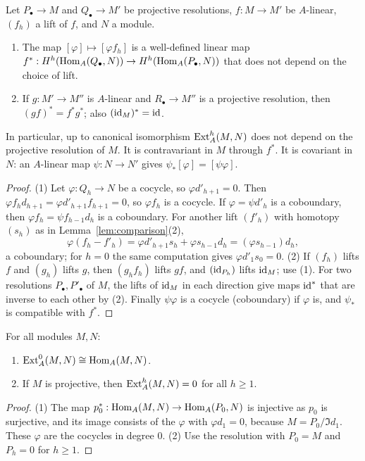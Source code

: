 \begin{proposition}\label{prop:ext-well-defined}
Let $P_\bullet\to M$ and $Q_\bullet\to M'$ be projective resolutions, $f:M\to M'$ be $A$-linear, $(f_h)$ a lift of $f$, and $N$ a module.
\begin{enumerate}
\item The map $[\varphi]\mapsto[\varphi f_h]$ is a well-defined linear map $f^*:H^h(\operatorname{Hom}\nolimits_A(Q_\bullet,N))\to H^h(\operatorname{Hom}\nolimits_A(P_\bullet,N))$ that does not depend on the choice of lift.
\item If $g:M'\to M''$ is $A$-linear and $R_\bullet\to M''$ is a projective resolution, then $(gf)^*=f^*g^*$; also $(\operatorname{id}_M)^*=\operatorname{id}$.
\end{enumerate}
In particular, up to canonical isomorphism $\operatorname{Ext}\nolimits_A^h(M,N)$ does not depend on the projective resolution of $M$.
It is contravariant in $M$ through $f^*$.
It is covariant in $N$: an $A$-linear map $\psi:N\to N'$ gives $\psi_*[\varphi]=[\psi\varphi]$.
\end{proposition}

\begin{proof}
(1) Let $\varphi:Q_h\to N$ be a cocycle, so $\varphi d'_{h+1}=0$.
Then $\varphi f_hd_{h+1}=\varphi d'_{h+1}f_{h+1}=0$, so $\varphi f_h$ is a cocycle.
If $\varphi=\psi d'_h$ is a coboundary, then $\varphi f_h=\psi f_{h-1}d_h$ is a coboundary.
For another lift $(f'_h)$ with homotopy $(s_h)$ as in Lemma~\ref{lem:comparison}(2),
\[
\varphi(f_h-f'_h)=\varphi d'_{h+1}s_h+\varphi s_{h-1}d_h=(\varphi s_{h-1})d_h,
\]
a coboundary; for $h=0$ the same computation gives $\varphi d'_1s_0=0$.
(2) If $(f_h)$ lifts $f$ and $(g_h)$ lifts $g$, then $(g_hf_h)$ lifts $gf$, and $(\operatorname{id}_{P_h})$ lifts $\operatorname{id}_M$; use (1).
For two resolutions $P_\bullet,P'_\bullet$ of $M$, the lifts of $\operatorname{id}_M$ in each direction give maps $\operatorname{id}^*$ that are inverse to each other by (2).
Finally $\psi\varphi$ is a cocycle (coboundary) if $\varphi$ is, and $\psi_*$ is compatible with $f^*$.
\end{proof}

\begin{proposition}\label{prop:ext-basic}
For all modules $M,N$:
\begin{enumerate}
\item $\operatorname{Ext}\nolimits_A^0(M,N)\cong\operatorname{Hom}\nolimits_A(M,N)$.
\item If $M$ is projective, then $\operatorname{Ext}\nolimits_A^h(M,N)=0$ for all $h\geq1$.
\end{enumerate}
\end{proposition}

\begin{proof}
(1) The map $p_0^*:\operatorname{Hom}\nolimits_A(M,N)\to\operatorname{Hom}\nolimits_A(P_0,N)$ is injective as $p_0$ is surjective, and its image consists of the $\varphi$ with $\varphi d_1=0$, because $M=P_0/\Im d_1$.
These $\varphi$ are the cocycles in degree $0$.
(2) Use the resolution with $P_0=M$ and $P_h=0$ for $h\geq1$.
\end{proof}

